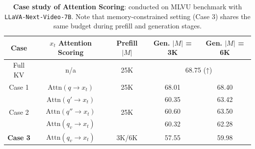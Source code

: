 \begin{table}
\scriptsize
\begin{tabular}{c|c|c|cc@{}}
\toprule
Case & \makecell{$x_t$ Attention \\ Scoring} & \makecell{Prefill \\ $|M|$} & \makecell{Gen. \\ $|M|$ = 3K} & \makecell{Gen. \\ $|M|$ = 6K} \\ 
\midrule
Full KV & n/a & 25K & \multicolumn{2}{c}{68.75 (↑)} \\ \midrule
Case 1 & $\text{Attn}(q \rightarrow x_{t})$ & 25K & 68.01 & 68.40 \\ \midrule
\multirow{3}{*}{Case 2} & $\text{Attn}(q' \rightarrow x_{t})$ & \multirow{3}{*}{25K} & 60.35 & 63.42 \\ 
                        & $\text{Attn}(q'' \rightarrow x_{t})$ & & 60.60 & 63.50 \\ 
                        & $\text{Attn}(q_v \rightarrow x_{t})$ & & 60.32 & 62.28 \\ \midrule
\textbf{Case 3} & $\text{Attn}(q_v \rightarrow x_{t})$ & 3K/6K & 57.55 & 59.98 \\ 
\bottomrule
\end{tabular}
\caption{\textbf{Case study of Attention Scoring}: conducted on MLVU benchmark with \texttt{LLaVA-Next-Video-7B}. Note that memory-constrained setting (Case 3) shares the same budget during prefill and generation stages.}\label{tab:case_study}
\vspace{-.15in}

\end{table}
